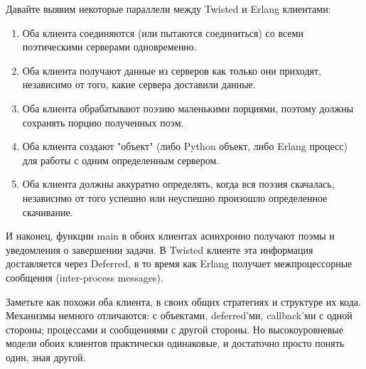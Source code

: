 Давайте выявим некоторые параллели между Twisted и Erlang клиентами:

\begin{enumerate}

\item Оба клиента соединяются (или пытаются соединиться) со всеми поэтическими серверами одновременно.

\item Оба клиента получают данные из серверов как только они приходят, 
независимо от того, какие сервера доставили данные.

\item Оба клиента обрабатывают поэзию маленькими порциями, поэтому должны 
сохранять порцию полученных поэм.

\item Оба клиента создают "объект" (либо Python объект, либо Erlang процесс) для 
работы с одним определенным сервером.

\item Оба клиента должны аккуратно определять, когда вся поэзия скачалась, 
независимо от того успешно или неуспешно произошло определенное скачивание.

\end{enumerate}


И наконец, функции main в обоих клиентах асинхронно получают 
поэмы и уведомления о завершении задачи. В Twisted клиенте эта информация 
доставляется через Deferred, в то время как Erlang получает межпроцессорные 
сообщения (inter-process messages).
 

Заметьте как похожи оба клиента, в своих общих стратегиях и 
структуре их кода. Механизмы немного отличаются: 
с объектами, deferred'ми, callback'ми с одной стороны; 
процессами и сообщениями с другой стороны. Но высокоуровневые 
модели обоих клиентов практически одинаковые, и достаточно 
просто понять один, зная другой.


